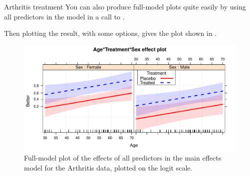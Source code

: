 \documentclass[11pt]{book}
\renewenvironment{knitrout}{\small\renewcommand{\baselinestretch}{.85}}{} %
\begin{document}
\begin{Example}{Arthritis treatment}
You can also produce full-model plots quite easily by using all predictors in the model
in a call to .
\begin{knitrout}
\color{fgcolor}\begin{kframe}
\begin{alltt}
 \hlkwb{<-} \hlstd{(}\hlstd{(}\hlstd{,} \hlstd{,} 
\end{alltt}
\end{kframe}
\end{knitrout}
Then plotting the result, with some options, gives the plot shown in .
\begin{knitrout}
\color{fgcolor}\begin{kframe}
\begin{alltt}
 \hlstd{=}\hlstd{,} \hlstd{=}\hlstd{,}
      \hlstd{=} \hlstd{(}\hlstd{,} \hlstd{),} \hlstd{=}\hlstd{,}
     \hlstd{=}\hlstd{(}\hlstd{=}\hlstd{,} \hlstd{=}\hlstd{),} \hlstd{=}\hlstd{)}
\end{alltt}
\end{kframe}\begin{figure}[!htbp]


\centerline{\includegraphics[width=.8\textwidth]{ch07/fig/arth-effplot2} }

\caption[Full-model plot of the effects of all predictors in the main effects model for the Arthritis data, plotted on the logit scale]{Full-model plot of the effects of all predictors in the main effects model for the Arthritis data, plotted on the logit scale.\label{fig:arth-effplot2}}
\end{figure}



\end{knitrout}
\end{Example}
\end{document}
